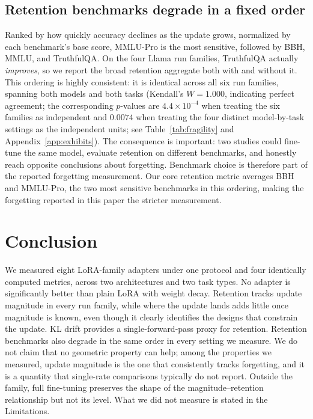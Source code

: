 \documentclass[11pt]{article}
\begin{document}
\subsection{Retention benchmarks degrade in a fixed order}\label{sec:results:rq4}
Ranked by how quickly accuracy declines as the update grows, normalized by
each benchmark's base score, MMLU-Pro is the most sensitive, followed by
BBH, MMLU, and TruthfulQA. On the four Llama run families, TruthfulQA
actually \emph{improves}, so we report the broad retention aggregate both
with and without it. This ordering is highly consistent: it is identical
across all six run families, spanning both models and both tasks
(Kendall's $W=1.000$, indicating perfect agreement; the corresponding
$p$-values are $4.4\times10^{-4}$ when treating the six families as
independent and $0.0074$ when treating the four distinct model-by-task
settings as the independent units; see Table~\ref{tab:fragility} and
Appendix~\ref{app:exhibits}). The consequence is important: two studies
could fine-tune the same model, evaluate retention on different
benchmarks, and honestly reach opposite conclusions about forgetting.
Benchmark choice is therefore part of the reported forgetting measurement.
Our core retention metric averages BBH and MMLU-Pro, the two most sensitive
benchmarks in this ordering, making the forgetting reported in this paper
the stricter measurement.

\section{Conclusion}\label{sec:conclusion}
We measured eight LoRA-family adapters under one protocol and four
identically computed metrics, across two architectures and two task types.
No adapter is significantly better than plain LoRA with weight decay.
Retention tracks update magnitude in every run family, while where the
update lands adds little once magnitude is known, even though it clearly
identifies the designs that constrain the update. KL drift provides a
single-forward-pass proxy for retention. Retention benchmarks also degrade
in the same order in every setting we measure. We do not claim that no
geometric property can help; among the properties we measured, update
magnitude is the one that consistently tracks forgetting, and it is a
quantity that single-rate comparisons typically do not report. Outside the
family, full fine-tuning preserves the shape of the magnitude--retention
relationship but not its level. What we did not measure is stated in the
Limitations.
\end{document}
